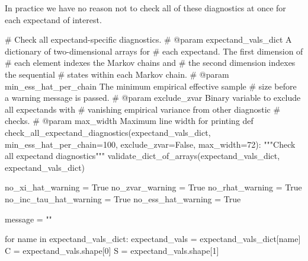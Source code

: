 \documentclass[
  letterpaper,
  DIV=11,
  numbers=noendperiod]{scrartcl}
\newenvironment{Shaded}{\begin{snugshade}}{\end{snugshade}}
\newcommand{\CommentTok}[1]{\textcolor[rgb]{0.37,0.37,0.37}{#1}}
\newcommand{\ControlFlowTok}[1]{\textcolor[rgb]{0.00,0.23,0.31}{#1}}
\newcommand{\DecValTok}[1]{\textcolor[rgb]{0.68,0.00,0.00}{#1}}
\newcommand{\KeywordTok}[1]{\textcolor[rgb]{0.00,0.23,0.31}{#1}}
\newcommand{\NormalTok}[1]{\textcolor[rgb]{0.00,0.23,0.31}{#1}}
\newcommand{\OperatorTok}[1]{\textcolor[rgb]{0.37,0.37,0.37}{#1}}
\newcommand{\StringTok}[1]{\textcolor[rgb]{0.13,0.47,0.30}{#1}}
\newcommand{\VariableTok}[1]{\textcolor[rgb]{0.07,0.07,0.07}{#1}}
\begin{document}
In practice we have no reason not to check all of these diagnostics at
once for each expectand of interest.

\begin{Shaded}
\begin{Highlighting}[]
\CommentTok{\# Check all expectand{-}specific diagnostics.}
\CommentTok{\# @param expectand\_vals\_dict A dictionary of two{-}dimensional arrays for}
\CommentTok{\#                            each expectand.  The first dimension of}
\CommentTok{\#                            each element indexes the Markov chains and}
\CommentTok{\#                            the second dimension indexes the sequential}
\CommentTok{\#                            states within each Markov chain.}
\CommentTok{\# @param min\_ess\_hat\_per\_chain The minimum empirical effective sample}
\CommentTok{\#                              size before a warning message is passed.}
\CommentTok{\# @param exclude\_zvar Binary variable to exclude all expectands with}
\CommentTok{\#                     vanishing empirical variance from other diagnostic}
\CommentTok{\#                     checks.}
\CommentTok{\# @param max\_width Maximum line width for printing}
\KeywordTok{def}\NormalTok{ check\_all\_expectand\_diagnostics(expectand\_vals\_dict,}
\NormalTok{                                    min\_ess\_hat\_per\_chain}\OperatorTok{=}\DecValTok{100}\NormalTok{,}
\NormalTok{                                    exclude\_zvar}\OperatorTok{=}\VariableTok{False}\NormalTok{,}
\NormalTok{                                    max\_width}\OperatorTok{=}\DecValTok{72}\NormalTok{):}
  \CommentTok{"""Check all expectand diagnostics"""}
\NormalTok{  validate\_dict\_of\_arrays(expectand\_vals\_dict, }\StringTok{\textquotesingle{}expectand\_vals\_dict\textquotesingle{}}\NormalTok{)}

\NormalTok{  no\_xi\_hat\_warning }\OperatorTok{=} \VariableTok{True}
\NormalTok{  no\_zvar\_warning }\OperatorTok{=} \VariableTok{True}
\NormalTok{  no\_rhat\_warning }\OperatorTok{=} \VariableTok{True}
\NormalTok{  no\_inc\_tau\_hat\_warning }\OperatorTok{=} \VariableTok{True}
\NormalTok{  no\_ess\_hat\_warning }\OperatorTok{=} \VariableTok{True}

\NormalTok{  message }\OperatorTok{=} \StringTok{""}

  \ControlFlowTok{for}\NormalTok{ name }\KeywordTok{in}\NormalTok{ expectand\_vals\_dict:}
\NormalTok{    expectand\_vals }\OperatorTok{=}\NormalTok{ expectand\_vals\_dict[name]}
\NormalTok{    C }\OperatorTok{=}\NormalTok{ expectand\_vals.shape[}\DecValTok{0}\NormalTok{]}
\NormalTok{    S }\OperatorTok{=}\NormalTok{ expectand\_vals.shape[}\DecValTok{1}\NormalTok{]}


\end{Highlighting}
\end{Shaded}
\end{document}
